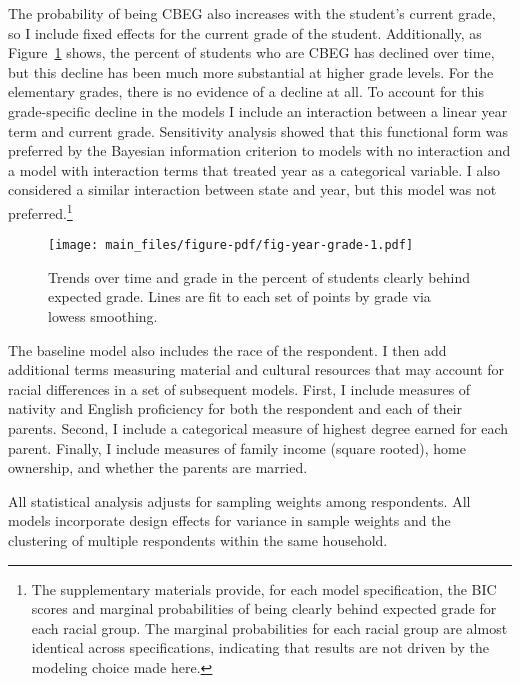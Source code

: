 \documentclass[
  12pt,
  letterpaper,
]{article}
\begin{document}
The probability of being CBEG also increases with the student's current
grade, so I include fixed effects for the current grade of the student.
Additionally, as Figure~\ref{fig-year-grade} shows, the percent of
students who are CBEG has declined over time, but this decline has been
much more substantial at higher grade levels. For the elementary grades,
there is no evidence of a decline at all. To account for this
grade-specific decline in the models I include an interaction between a
linear year term and current grade. Sensitivity analysis showed that
this functional form was preferred by the Bayesian information criterion
to models with no interaction and a model with interaction terms that
treated year as a categorical variable. I also considered a similar
interaction between state and year, but this model was not
preferred.\footnote{The supplementary materials provide, for each model
  specification, the BIC scores and marginal probabilities of being
  clearly behind expected grade for each racial group. The marginal
  probabilities for each racial group are almost identical across
  specifications, indicating that results are not driven by the modeling
  choice made here.}

\begin{figure}[t]

{\centering \texttt{[image: main\_files/figure-pdf/fig-year-grade-1.pdf]}

}

\caption{\label{fig-year-grade}Trends over time and grade in the percent
of students clearly behind expected grade. Lines are fit to each set of
points by grade via lowess smoothing.}

\end{figure}

The baseline model also includes the race of the respondent. I then add
additional terms measuring material and cultural resources that may
account for racial differences in a set of subsequent models. First, I
include measures of nativity and English proficiency for both the
respondent and each of their parents. Second, I include a categorical
measure of highest degree earned for each parent. Finally, I include
measures of family income (square rooted), home ownership, and whether
the parents are married.

All statistical analysis adjusts for sampling weights among respondents.
All models incorporate design effects for variance in sample weights and
the clustering of multiple respondents within the same household.
\end{document}

